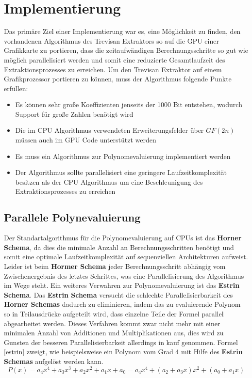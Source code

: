 \section{Implementierung}

Das primäre Ziel einer Implementierung war es, eine Möglichkeit zu finden, den vorhandenen Algorithmus des Trevisan Extraktors so auf die GPU einer Grafikkarte zu portieren, dass die zeitaufwändigen Berechnungsschritte so gut wie möglich parallelisiert werden und somit eine reduzierte Gesamtlaufzeit des Extraktionsprozesses zu erreichen.\newline
Um den Trevisan Extraktor auf einem Grafikprozessor portieren zu können, muss der Algorithmus folgende Punkte erfüllen:
\begin{itemize}
	\item Es können sehr große Koeffizienten jenseits der 1000 Bit entstehen, wodurch Support für große Zahlen benötigt wird
	\item Die im CPU Algorithmus verwendeten Erweiterungsfelder über $GF(2n)$ müssen auch im GPU Code unterstützt werden
	\item Es muss ein Algorithmus zur Polynomevaluierung implementiert werden 
	\item Der Algorithmus sollte parallelisiert eine geringere Laufzeitkomplexität besitzen als der CPU Algorithmus um eine Beschleunigung des Extraktionsprozesses zu erreichen
\end{itemize}

\subsection{Parallele Polynevaluierung}
Der Standartalgorithmus für die Polynomevaluierung auf CPUs ist das \textbf{Horner Schema}, da dies die minimale Anzahl an Berechnungsschritten benötigt und somit eine optimale Laufzeitkomplexität auf sequenziellen Architekturen aufweist. Leider ist beim \textbf{Hormer Schema} jeder Berechnungsschritt abhängig vom Zwischenergebnis des letztes Schrittes, was eine Parallelisierung des Algorithmus im Wege steht.\newline
Ein weiteres Verwahren zur Polynomevaluierung ist das \textbf{Estrin Schema}. Das \textbf{Estrin Schema} versucht die schlechte Parallelisierbarkeit des \textbf{Horner Schemas} dadurch zu eliminieren, indem das zu evaluierende Polynom so in Teilausdrücke aufgeteilt wird, dass einzelne Teile der Formel parallel abgearbeitet werden. Dieses Verfahren kommt zwar nicht mehr mit einer minimalen Anzahl von Additionen und Multiplikationen aus, dies wird zu Gunsten der besseren Parallelisierbarkeit allerdings in kauf genommen.\newline
Formel \eqref{estrin} zweigt, wie beispielsweise ein Polynom vom Grad 4 mit Hilfe des \textbf{Estrin Schemas} aufgelöst werden kann.
\begin{equation}\label{estrin}
P(x) = a_4x^4 + a_3x^3 + a_2x^2 + a_1x + a_0 = a_4x^4 + (a_2+a_3x)x^2 + (a_0+a_1x)
\end{equation}

